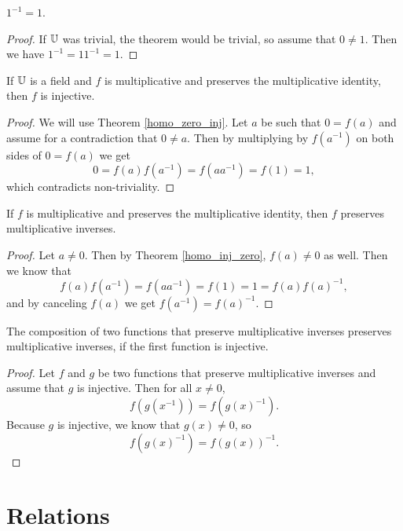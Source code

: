 \documentclass[../math.tex]{subfiles}
\begin{document}
\begin{theorem}
    $1^{-1} = 1$.
\end{theorem}
\begin{proof}
    If $\mathbb{U}$ was trivial, the theorem would be trivial, so assume that $0 \neq
    1$.  Then we have $1^{-1} = 1 1^{-1} = 1$.
\end{proof}

\begin{instance}
    If $\mathbb{U}$ is a field and $f$ is multiplicative and preserves the
    multiplicative identity, then $f$ is injective.
\end{instance}
\begin{proof}
    We will use Theorem \ref{homo_zero_inj}.  Let $a$ be such that $0 = f(a)$
    and assume for a contradiction that $0 \neq a$.  Then by multiplying by
    $f(a^{-1})$ on both sides of $0 = f(a)$ we get
    \[
        0 = f(a) f(a^{-1}) = f(a a^{-1}) = f(1) = 1,
    \]
    which contradicts non-triviality.
\end{proof}

\begin{instance}
    If $f$ is multiplicative and preserves the multiplicative identity, then $f$
    preserves multiplicative inverses.
\end{instance}
\begin{proof}
    Let $a \neq 0$.  Then by Theorem \ref{homo_inj_zero}, $f(a) \neq 0$ as well.
    Then we know that \[
        f(a) f(a^{-1}) = f(a a^{-1}) = f(1) = 1 = f(a) f(a)^{-1},
    \]
    and by canceling $f(a)$ we get $f(a^{-1}) = f(a)^{-1}$.
\end{proof}

\begin{instance}
    The composition of two functions that preserve multiplicative inverses
    preserves multiplicative inverses, if the first function is injective.
\end{instance}
\begin{proof}
    Let $f$ and $g$ be two functions that preserve multiplicative inverses and
    assume that $g$ is injective.  Then for all $x \neq 0$,
    \[
        f(g(x^{-1})) = f(g(x)^{-1}).
    \]
    Because $g$ is injective, we know that $g(x) \neq 0$, so
    \[
        f(g(x)^{-1}) = f(g(x))^{-1}.
    \]
\end{proof}

\section{Relations}
\end{document}
